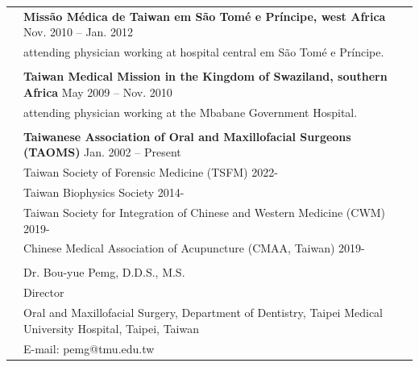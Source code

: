 \documentclass[letterpaper, 11pt]{article}
\begin{document}
\begin{longtable}{p{1.3in}p{4.8in}}
& \textbf{Missão Médica de Taiwan em São Tomé e Príncipe, west Africa} \hfill Nov. 2010 -- Jan. 2012 \\
& attending physician working at hospital central em São Tomé e Príncipe. \\
& \\

& \textbf{Taiwan Medical Mission in the Kingdom of Swaziland, southern Africa} \hfill May 2009 -- Nov. 2010 \\
& attending physician working at the Mbabane Government Hospital. \\
& \\


\nohyphens{\color{OliveGreen}{Professional memberships}}
& {\textbf{Taiwanese Association of Oral and Maxillofacial Surgeons (TAOMS)}} \hfill Jan. 2002 -- Present \\
& Taiwan Society of Forensic Medicine (TSFM) \hfill 2022-\\ 
& Taiwan Biophysics Society \hfill 2014-\\ 
& Taiwan Society for Integration of Chinese and Western Medicine (CWM) \hfill 2019-\\
& Chinese Medical Association of Acupuncture (CMAA, Taiwan) \hfill 2019- \\
& \\




\nohyphens{\color{OliveGreen}{References}} 
& Dr. Bou-yue Pemg, D.D.S., M.S.\\
& Director\\
& Oral and Maxillofacial Surgery, Department of Dentistry,
Taipei Medical University Hospital,
Taipei, Taiwan\\
& E-mail: pemg@tmu.edu.tw\\[0.5cm]



\end{longtable}
\end{document}
